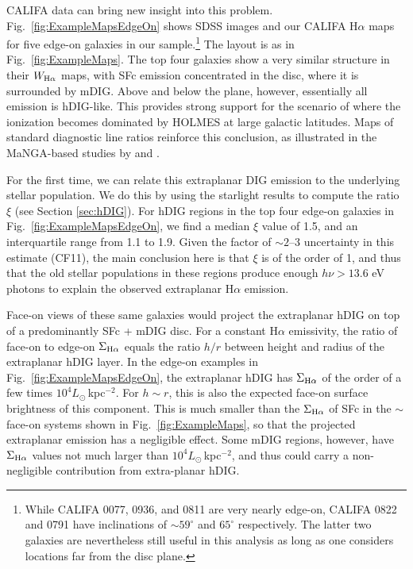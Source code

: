 \documentclass[a4paper, fleqn, usenatbib, useAMS]{mnras}
\newcommand{\Ha}{\ifmmode {\rm H}\alpha \else H$\alpha$\fi\xspace}
\begin{document}
CALIFA data can bring new insight into this problem. Fig.\ \ref{fig:ExampleMapsEdgeOn} shows SDSS images and our CALIFA \Ha maps for five edge-on galaxies in our sample.\footnote{While CALIFA 0077, 0936, and 0811 are very nearly edge-on, CALIFA 0822 and 0791 have inclinations of $\sim 59^\circ$ and $65^\circ$ respectively. The latter two galaxies are nevertheless still useful in this analysis as long as one considers locations far from the disc plane.} The layout is as in Fig.\ \ref{fig:ExampleMaps}. The top four galaxies show a very similar structure in their $W_{\Ha}$ maps, with SFc emission concentrated in the disc, where it is surrounded by mDIG. Above and below the plane, however, essentially all emission is hDIG-like. This provides strong support for the scenario of \citet{FloresFajardo.etal.2011a} where the ionization becomes dominated by HOLMES at large galactic latitudes. Maps of standard diagnostic line ratios reinforce this conclusion, as illustrated in the MaNGA-based studies by \citet{Belfiore.etal.2016} and \citet{Zhang.etal.2017a}.

For the first time, we can relate this extraplanar DIG emission to the underlying stellar population. We do this by using the {\sc starlight} results to compute the ratio $\xi$ (see Section \ref{sec:hDIG}). For hDIG regions in the top four edge-on galaxies in Fig.\ \ref{fig:ExampleMapsEdgeOn}, we find a median $\xi$ value of 1.5, and an interquartile range from 1.1 to 1.9. Given the factor of $\sim 2$--3 uncertainty in this estimate (CF11), the main conclusion here is that $\xi$ is of the order of 1, and thus that the old stellar populations in these regions produce enough $h\nu > 13.6$ eV photons to explain the observed extraplanar \Ha emission.

Face-on views of these same galaxies would project the extraplanar hDIG on top of a predominantly SFc + mDIG disc. For a constant \Ha emissivity, the ratio of face-on to edge-on $\Sigma_{\Ha}$ equals the ratio $h / r$ between height and radius of the extraplanar hDIG layer. In the edge-on examples in Fig.\ \ref{fig:ExampleMapsEdgeOn}, the extraplanar hDIG has $\Sigma_{\Ha}$ of the order of a few times $10^4 L_\odot\,$kpc$^{-2}$. For $h \sim r$, this is also the expected face-on surface brightness of this component. This is much smaller than the $\Sigma_{\Ha}$ of SFc in the $\sim$ face-on systems shown in Fig.\ \ref{fig:ExampleMaps}, so that the projected extraplanar emission has a negligible effect. Some mDIG regions, however, have $\Sigma_{\Ha}$ values not much larger than $10^4 L_\odot\,$kpc$^{-2}$, and thus could carry a non-negligible contribution from extra-planar hDIG.
\end{document}
